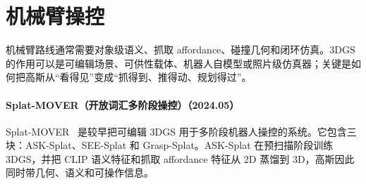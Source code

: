 \section{机械臂操控}

机械臂路线通常需要对象级语义、抓取 affordance、碰撞几何和闭环仿真。3DGS 的作用可以是可编辑场景、可供性载体、机器人自模型或照片级仿真器；关键是如何把高斯从“看得见”变成“抓得到、推得动、规划得过”。
\paragraph{Splat-MOVER（开放词汇多阶段操控）（2024.05）}
Splat-MOVER~\cite{2405_04378} 是较早把可编辑 3DGS 用于多阶段机器人操控的系统。它包含三块：ASK-Splat、SEE-Splat 和 Grasp-Splat。ASK-Splat 在预扫描阶段训练 3DGS，并把 CLIP 语义特征和抓取 affordance 特征从 2D 蒸馏到 3D，高斯因此同时带几何、语义和可操作信息。

